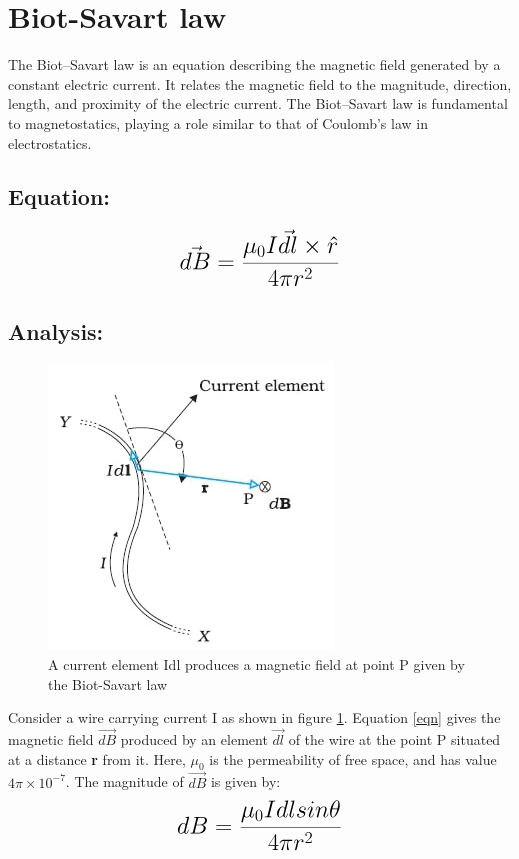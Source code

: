 
\section{Biot-Savart law}
The Biot–Savart law is an equation describing the magnetic field generated by a constant electric current. It relates the magnetic field to the magnitude, direction, length, and proximity of the electric current. The Biot–Savart law is fundamental to magnetostatics, playing a role similar to that of Coulomb's law in electrostatics.\cite{webref1}
\subsection{Equation:}
\begin{equation}
    {\LARGE{\textbf{$\vec{dB}=\frac{\mu_{0} I\vec{dl}\times\hat{r}}{4\pi r^2}$}}}
    \label{eqn}
\end{equation}
\subsection{Analysis:}
\begin{figure}[h]
	{\begin{center}
		\includegraphics[scale=0.5]{ME20B029.jpg}
	\end{center}}
	\caption{A current element Idl produces a magnetic field at point P given by the Biot-Savart law \cite{picture}}
	\label{fig}
\end{figure}
Consider a wire carrying current I as shown in figure \ref{fig}. Equation \ref{eqn} gives the magnetic field {$\vec{dB}$} produced by an element {$\vec{dl}$} 
of the wire at the point P situated at a distance {\textbf{r}} from it. Here, {$\mu_{0}$} is the permeability of free space, and has value {$4\pi\times10^{-7}$}.\cite{webref2}
The magnitude of {$\vec{dB}$} is given by: 
\begin{equation}
{\LARGE{\textbf{${dB}=\frac{\mu_{0} Idlsin\theta}{4\pi r^2}$}}}
\end{equation}
